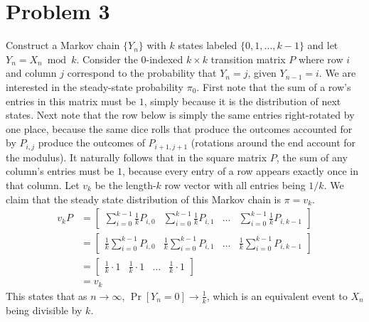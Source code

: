 \documentclass[11pt]{article}
\newcommand{\asdf}{\newline\newline}
\begin{document}
\section*{Problem 3}
Construct a Markov chain $\{Y_n\}$ with $k$ states labeled $\{0,1,\ldots,k-1\}$ and let $Y_n=X_n\bmod k$. Consider the $0$-indexed $k\times k$ transition matrix $P$ where row $i$ and column $j$ correspond to the probability that $Y_n=j$, given $Y_{n-1}=i$. We are interested in the steady-state probability $\pi_0$.\asdf
First note that the sum of a row's entries in this matrix must be $1$, simply because it is the distribution of next states. Next note that the row below is simply the same entries right-rotated by one place, because the same dice rolls that produce the outcomes accounted for by $P_{i,j}$ produce the outcomes of $P_{i+1,j+1}$ (rotations around the end account for the modulus). It naturally follows that in the square matrix $P$, the sum of any column's entries must be $1$, because every entry of a row appears exactly once in that column.\asdf
Let $v_k$ be the length-$k$ row vector with all entries being $1/k$. We claim that the steady state distribution of this Markov chain is $\pi=v_k$.
\begin{align*}
v_kP &= \begin{bmatrix}\sum_{i=0}^{k-1}\frac1kP_{i,0}&\sum_{i=0}^{k-1}\frac1kP_{i,1}&\ldots&\sum_{i=0}^{k-1}\frac1kP_{i,k-1}\end{bmatrix}\\
&= \begin{bmatrix}\frac1k\sum_{i=0}^{k-1}P_{i,0}&\frac1k\sum_{i=0}^{k-1}P_{i,1}&\ldots&\frac1k\sum_{i=0}^{k-1}P_{i,k-1}\end{bmatrix}\\
&= \begin{bmatrix}\frac1k\cdot1&\frac1k\cdot1&\ldots&\frac1k\cdot1\end{bmatrix}\\
&= v_k
\end{align*}
This states that as $n\rightarrow\infty$, $\Pr[Y_n=0]\rightarrow\frac1k$, which is an equivalent event to $X_n$ being divisible by $k$.


\newpage
\end{document}
